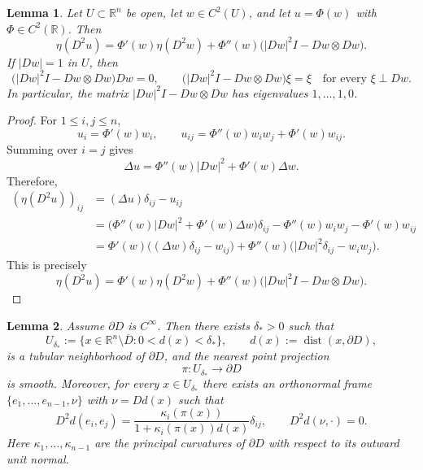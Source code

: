 \documentclass[reqno,a4paper]{amsart}
\numberwithin{equation}{section}
\newtheorem{lemma}{Lemma}[section]
\begin{document}
	\begin{lemma}\label{lem:eta_composition}
		Let $U \subset \mathbb{R}^n$ be open, let $w \in C^2(U)$, and let $u = \Phi(w)$ with $\Phi \in C^2(\mathbb{R})$. Then
		\[
		\eta(D^2u) = \Phi'(w)\eta(D^2w) + \Phi''(w)\bigl(|Dw|^2 I - Dw \otimes Dw\bigr).
		\]
		If $|Dw| = 1$ in $U$, then
		\[
		\bigl(|Dw|^2 I - Dw \otimes Dw\bigr)Dw = 0, \qquad
		\bigl(|Dw|^2 I - Dw \otimes Dw\bigr)\xi = \xi \quad \text{for every } \xi \perp Dw.
		\]
		In particular, the matrix $|Dw|^2 I - Dw \otimes Dw$ has eigenvalues $1, \ldots, 1, 0$.
	\end{lemma}
	
	\begin{proof}
		For $1 \le i, j \le n$,
		\[
		u_i = \Phi'(w)w_i, \qquad u_{ij} = \Phi''(w)w_iw_j + \Phi'(w)w_{ij}.
		\]
		Summing over $i = j$ gives
		\[
		\Delta u = \Phi''(w)|Dw|^2 + \Phi'(w)\Delta w.
		\]
		Therefore,
		\[
		\begin{aligned}
			(\eta(D^2u))_{ij}
			&= (\Delta u)\delta_{ij} - u_{ij} \\
			&= \bigl(\Phi''(w)|Dw|^2 + \Phi'(w)\Delta w\bigr)\delta_{ij}
			- \Phi''(w)w_iw_j - \Phi'(w)w_{ij} \\
			&= \Phi'(w)\bigl((\Delta w)\delta_{ij} - w_{ij}\bigr)
			+ \Phi''(w)\bigl(|Dw|^2\delta_{ij} - w_iw_j\bigr).
		\end{aligned}
		\]
		This is precisely
		\[
		\eta(D^2u) = \Phi'(w)\eta(D^2w) + \Phi''(w)\bigl(|Dw|^2 I - Dw \otimes Dw\bigr).
		\]
	\end{proof}
	
	\begin{lemma}\label{lem:tubular}
		Assume $\partial D$ is $C^\infty$. Then there exists $\delta_* > 0$ such that
		\[
		U_{\delta_*} := \{x \in \mathbb{R}^n \setminus \overline{D} : 0 < d(x) < \delta_*\}, \qquad d(x) := \operatorname{dist}(x, \partial D),
		\]
		is a tubular neighborhood of $\partial D$, and the nearest point projection
		\[
		\pi : U_{\delta_*} \to \partial D
		\]
		is smooth. Moreover, for every $x \in U_{\delta_*}$ there exists an orthonormal frame $\{e_1, \ldots, e_{n-1}, \nu\}$ with $\nu = Dd(x)$ such that
		\begin{equation}
			D^2d(e_i, e_j) = \frac{\kappa_i(\pi(x))}{1 + \kappa_i(\pi(x))d(x)}\delta_{ij}, \qquad D^2d(\nu, \cdot) = 0.
		\end{equation}
		Here $\kappa_1, \ldots, \kappa_{n-1}$ are the principal curvatures of $\partial D$ with respect to its outward unit normal.
	\end{lemma}
	
\end{document}
